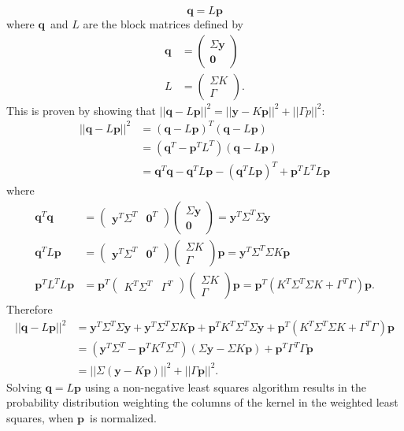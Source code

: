 \documentclass{article}
\newcommand{\y}{\ensuremath{\bm{y}}}
\newcommand{\p}{\ensuremath{\bm{p}}}
\newcommand{\q}{\ensuremath{\bm{q}}}
\begin{document}
%
\begin{equation}
\q = L\p
\end{equation}
%
where \q\ and $L$ are the block matrices defined by 
%
\begin{align}
\q &= \left(\begin{array}{c}
\Sigma\y \\ \bm{0}
\end{array}\right)\\ 
L &= 
\left(\begin{array}{c}
\Sigma K \\ \Gamma
\end{array}\right).
\end{align}
% 
This is proven by showing that $||\q-L\p||^2 = ||\y-K\p||^2+||\Gamma p||^2$: 
%
\begin{align}
||\q-L\p||^2 &= (\q-L\p)^T(\q-L\p)\\
&= (\q^T-\p^TL^T)(\q-L\p)\\
&= \q^T\q-\q^TL\p-(\q^TL\p)^T+\p^TL^TL\p
\end{align}
%
where 
%
\begin{align}
\q^T\q &= \left(\begin{array}{cc}
\y^T\Sigma^T & \bm{0}^T
\end{array}\right)\left(\begin{array}{c}
\Sigma\y \\ \bm{0}
\end{array}\right)
= \y^T\Sigma^T\Sigma\y\\
%
\q^TL\p &= \left(\begin{array}{cc}
\y^T\Sigma^T & \bm{0}^T
\end{array}\right)\left(\begin{array}{c}
\Sigma K \\ \Gamma
\end{array}\right)\p
= \y^T\Sigma^T\Sigma K\p\\
%
\p^TL^TL\p &= \p^T\left(\begin{array}{cc}
K^T\Sigma^T & \Gamma^T
\end{array}\right)\left(\begin{array}{c}
\Sigma K \\ \Gamma
\end{array}\right)\p 
= \p^T(K^T\Sigma^T \Sigma K + \Gamma^T\Gamma)\p.
\end{align}
%
Therefore 
%
\begin{align}
||\q-L\p||^2 &= \y^T\Sigma^T\Sigma\y + \y^T\Sigma^T\Sigma K\p + \p^TK^T\Sigma^T \Sigma \y + \p^T(K^T\Sigma^T \Sigma K + \Gamma^T\Gamma)\p\\
&= (\y^T\Sigma^T -\p^TK^T\Sigma^T)(\Sigma \y -\Sigma K\p) + \p^T\Gamma^T\Gamma\p\\
&= ||\Sigma (\y - K\p)||^2 + ||\Gamma\p||^2.
\end{align}
%
Solving $\q = L\p$ using a non-negative least squares algorithm results in the probability distribution weighting the columns of the kernel in the weighted least squares, when \p\ is normalized.
\end{document}
